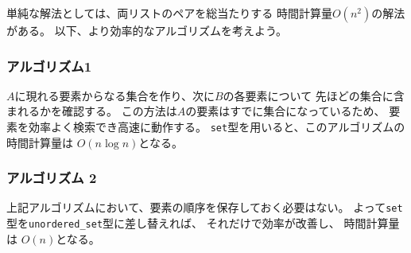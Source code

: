 単純な解法としては、両リストのペアを総当たりする
時間計算量$O(n^2)$の解法がある。
以下、より効率的なアルゴリズムを考えよう。

\begin{comment}
\subsubsection{Algorithm 1}

We construct a set of the elements that appear in $A$,
and after this, we iterate through the elements
of $B$ and check for each elements if it
also belongs to $A$.
This is efficient because the elements of $A$
are in a set.
Using the \texttt{set} structure,
the time complexity of the algorithm is $O(n \log n)$.
\end{comment}

\subsubsection{アルゴリズム1}

$A$に現れる要素からなる集合を作り、次に$B$の各要素について
先ほどの集合に含まれるかを確認する。
この方法は$A$の要素はすでに集合になっているため、
要素を効率よく検索でき高速に動作する。
\texttt{set}型を用いると、このアルゴリズムの時間計算量は
$O(n \log n)$となる。

\begin{comment}
\subsubsection{Algorithm 2}

It is not necessary to maintain an ordered set,
so instead of the \texttt{set} structure
we can also use the \texttt{unordered\_set} structure.
This is an easy way to make the algorithm
more efficient, because we only have to change
the underlying data structure.
The time complexity of the new algorithm is $O(n)$.
\end{comment}

\subsubsection{アルゴリズム 2}

上記アルゴリズムにおいて、要素の順序を保存しておく必要はない。
よって\texttt{set}型を\texttt{unordered\_set}型に差し替えれば、
それだけで効率が改善し、 時間計算量は
$O(n)$となる。

\begin{comment}
\subsubsection{Algorithm 3}

Instead of data structures, we can use sorting.
First, we sort both lists $A$ and $B$.
After this, we iterate through both the lists
at the same time and find the common elements.
The time complexity of sorting is $O(n \log n)$,
and the rest of the algorithm works in $O(n)$ time,
so the total time complexity is $O(n \log n)$.
\end{comment}

